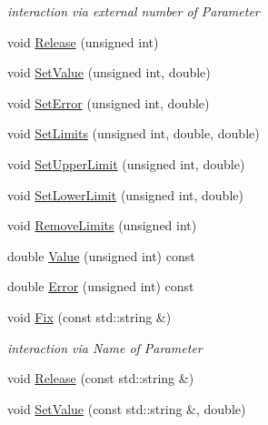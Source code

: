 \begin{DoxyCompactItemize}
\begin{DoxyCompactList}\small\item\em interaction via external number of Parameter \end{DoxyCompactList}\item 
void \mbox{\hyperlink{classROOT_1_1Minuit2_1_1MnUserParameters_a7bd8fe4d8f50de145f3f3abc6ec4fae4}{Release}} (unsigned int)
\item 
void \mbox{\hyperlink{classROOT_1_1Minuit2_1_1MnUserParameters_a6a2523d00c1b000fbc1c95da7a4a926a}{Set\+Value}} (unsigned int, double)
\item 
void \mbox{\hyperlink{classROOT_1_1Minuit2_1_1MnUserParameters_a64cbb6833d91d7f3bdef5b4dec9ae20f}{Set\+Error}} (unsigned int, double)
\item 
void \mbox{\hyperlink{classROOT_1_1Minuit2_1_1MnUserParameters_afa56296f97716c90cfbdd3f81d5caffc}{Set\+Limits}} (unsigned int, double, double)
\item 
void \mbox{\hyperlink{classROOT_1_1Minuit2_1_1MnUserParameters_a9127811ac07731aea64f1869a620d11b}{Set\+Upper\+Limit}} (unsigned int, double)
\item 
void \mbox{\hyperlink{classROOT_1_1Minuit2_1_1MnUserParameters_a5fa6d9f50413c05aabed1d11ee26c6cc}{Set\+Lower\+Limit}} (unsigned int, double)
\item 
void \mbox{\hyperlink{classROOT_1_1Minuit2_1_1MnUserParameters_a399fd2fff4e1055c0878c8ce24205544}{Remove\+Limits}} (unsigned int)
\item 
double \mbox{\hyperlink{classROOT_1_1Minuit2_1_1MnUserParameters_a5084b0d1312ddb87609ff726a11fd7f6}{Value}} (unsigned int) const
\item 
double \mbox{\hyperlink{classROOT_1_1Minuit2_1_1MnUserParameters_a08122c2515f2f3505ae14a26f7112dcc}{Error}} (unsigned int) const
\item 
void \mbox{\hyperlink{classROOT_1_1Minuit2_1_1MnUserParameters_a2ae09cd0fae9785d4c097439862ab63b}{Fix}} (const std\+::string \&)
\begin{DoxyCompactList}\small\item\em interaction via Name of Parameter \end{DoxyCompactList}\item 
void \mbox{\hyperlink{classROOT_1_1Minuit2_1_1MnUserParameters_ac178a853a9641a88a9a1412224e6e105}{Release}} (const std\+::string \&)
\item 
void \mbox{\hyperlink{classROOT_1_1Minuit2_1_1MnUserParameters_a83c0197f87bd6722f0ddfed4bf406fbe}{Set\+Value}} (const std\+::string \&, double)

\end{DoxyCompactItemize}
